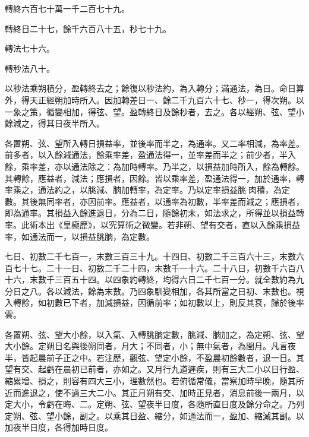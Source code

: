 \begin{pinyinscope}
 轉終六百七十萬一千二百七十九。



 轉終日二十七，餘千六百八十五，秒七十九。



 轉法七十六。



 轉秒法八十。



 以秒法乘朔積分，盈轉終去之；餘復以秒法約，為入轉分；滿通法，為日。命日算外，得天正經朔加時所入。因加轉差日一、餘二千九百六十七、秒一，得次朔。以一象之策，循變相加，得弦、望。盈轉終日及餘秒者，去之。各以經朔、弦、望小餘減之，得其日夜半所入。



 各置朔、弦、望所入轉日損益率，並後率而半之，為通率。又二率相減，為率差。前多者，以入餘減通法，餘乘率差，盈通法得一，並率差而半之；前少者，半入餘，乘率差，亦以通法除之：為加時轉率。乃半之，以損益加時所入，餘為轉餘。其轉餘，應益者，減法；應損者，因餘。皆以乘率差，盈通法得一，加於通率，轉率乘之，通法約之，以朓減、朒加轉率，為定率。乃以定率損益朓肉積，為定數。其後無同率者，亦因前率。應益者，以通率為初數，半率差而減之；應損者，即為通率。其損益入餘進退日，分為二日，隨餘初末，如法求之，所得並以損益轉率。此術本出《皇極歷》，以究算術之微變。若非朔、望有交者，直以入餘乘損益率，如通法而一，以損益朓朒，為定數。



 七日、初數二千七百一，末數三百三十九。十四日、初數二千三百六十三，末數六百七十七。二十一日、初數二千二十四，末數千一十六。二十八日，初數千六百八十六，末數千三百五十四。以四象約轉終，均得六日二千七百一分。就全數約為九分日之八。各以減法，餘為末數。乃四象馴變相加，各其所當之日初、末數也。視入轉餘，如初數已下者，加減損益，因循前率；如初數以上，則反其衰，歸於後率雲。



 各置朔、弦、望大小餘，以入氣、入轉朓朒定數，朓減、朒加之，為定朔、弦、望大小餘。定朔日名與後朔同者，月大；不同者，小；無中氣者，為閏月。凡言夜半，皆起晨前子正之中。若注歷，觀弦、望定小餘，不盈晨初餘數者，退一日。其望有交、起虧在晨初已前者，亦如之。又月行九道遲疾，則有三大二小以日行盈、縮累增、損之，則容有四大三小，理數然也。若俯循常儀，當察加時早晚，隨其所近而進退之，使不過三大二小。其正月朔有交、加時正見者，消息前後一兩月，以定大小，令虧在晦、二。定朔、弦、望夜半日度，各隨所直日度及餘分命之。乃列定朔、弦、望小餘，副之。以乘其日盈、縮分，如通法而一，盈加、縮減其副。以加夜半日度，各得加時日度。




\end{pinyinscope}
